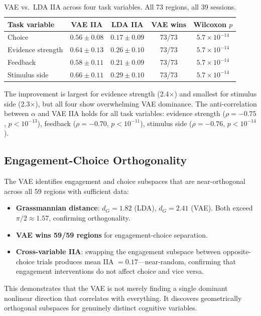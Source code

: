 \documentclass{article}
\begin{document}
\begin{table}[h]
\centering
\small
\caption{VAE vs.\ LDA IIA across four task variables. All 73 regions, all 39 sessions.}
\label{tab:multitask}
\begin{tabular}{lcccc}
\toprule
Task variable & VAE IIA & LDA IIA & VAE wins & Wilcoxon $p$ \\
\midrule
Choice & $0.56 \pm 0.08$ & $0.17 \pm 0.09$ & 73/73 & $5.7 \times 10^{-14}$ \\
Evidence strength & $0.64 \pm 0.13$ & $0.26 \pm 0.10$ & 73/73 & $5.7 \times 10^{-14}$ \\
Feedback & $0.58 \pm 0.11$ & $0.21 \pm 0.09$ & 73/73 & $5.7 \times 10^{-14}$ \\
Stimulus side & $0.66 \pm 0.11$ & $0.29 \pm 0.10$ & 73/73 & $5.7 \times 10^{-14}$ \\
\bottomrule
\end{tabular}
\end{table}

The improvement is largest for evidence strength (2.4$\times$) and smallest for stimulus side (2.3$\times$), but all four show overwhelming VAE dominance. The anti-correlation between $\alpha$ and VAE IIA holds for all task variables: evidence strength ($\rho = -0.75$, $p < 10^{-13}$), feedback ($\rho = -0.70$, $p < 10^{-11}$), stimulus side ($\rho = -0.76$, $p < 10^{-14}$).

\subsection{Engagement-Choice Orthogonality}

The VAE identifies engagement and choice subspaces that are near-orthogonal across all 59 regions with sufficient data:

\begin{itemize}
\item \textbf{Grassmannian distance}: $d_G = 1.82$ (LDA), $d_G = 2.41$ (VAE). Both exceed $\pi/2 \approx 1.57$, confirming orthogonality.
\item \textbf{VAE wins 59/59 regions} for engagement-choice separation.
\item \textbf{Cross-variable IIA}: swapping the engagement subspace between opposite-choice trials produces mean IIA $= 0.17$---near-random, confirming that engagement interventions do not affect choice and vice versa.
\end{itemize}

This demonstrates that the VAE is not merely finding a single dominant nonlinear direction that correlates with everything. It discovers geometrically orthogonal subspaces for genuinely distinct cognitive variables.
\end{document}
